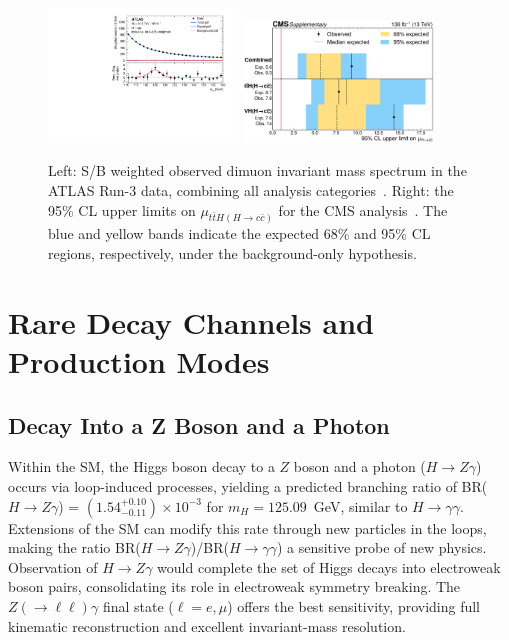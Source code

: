 \documentclass[a4paper,11pt]{article}
\begin{document}
\begin{figure}[!tbp]
\centering
\includegraphics[width=0.45\textwidth]{hmumu-atlas}
\includegraphics[width=0.45\textwidth]{ttHcc-cms}
\caption
    {Left: S/B weighted observed dimuon invariant mass spectrum in the
      ATLAS Run-3 data, combining all analysis
      categories~\cite{hmumu-atlas}. Right: the 95\% CL upper limits on
      $\mu_{t\bar t H(H\to c\bar c)}$ for the CMS analysis~\cite{tthcc-cms}. The blue
      and yellow bands indicate the expected 68\% and 95\% CL regions,
      respectively, under the background-only hypothesis.
      \label{fig:gen2f}
    }
\end{figure}

\section{Rare Decay Channels and Production Modes}

\subsection{Decay Into a Z Boson and a Photon}

Within the SM, the Higgs boson decay to a $Z$ boson and a photon ($H
\to Z\gamma$) occurs via loop-induced processes, yielding a predicted
branching ratio of BR($H \to Z\gamma$) = $(1.54^{+0.10}_{-0.11})
\times 10^{-3}$ for $m_H = 125.09$~GeV, similar to $H \to
\gamma\gamma$. Extensions of the SM can modify this rate through new
particles in the loops, making the ratio BR($H \to Z\gamma$)/BR($H \to
\gamma\gamma$) a sensitive probe of new physics. Observation of $H \to
Z\gamma$ would complete the set of Higgs decays into electroweak boson
pairs, consolidating its role in electroweak symmetry breaking. The
$Z(\to \ell\ell)\gamma$ final state ($\ell=e,\mu$) offers the best
sensitivity, providing full kinematic reconstruction and excellent
invariant-mass resolution.
\end{document}
